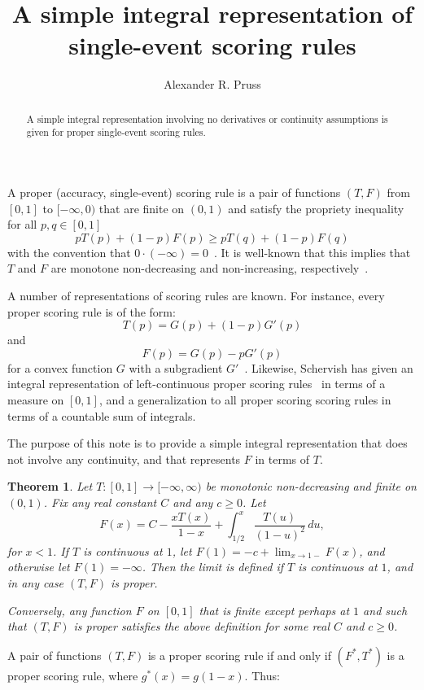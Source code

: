 \documentclass[11pt]{amsart} %
\title{A simple integral representation of single-event scoring rules}
\author{Alexander R. Pruss}
\newtheorem{thm}{Theorem}
\begin{document}
\begin{abstract}
A simple integral representation involving no derivatives or continuity assumptions is given for
proper single-event scoring rules.
\end{abstract}
\sloppy

\maketitle
A proper (accuracy, single-event) scoring rule is a pair of functions $(T,F)$ from $[0,1]$ to $[-\infty,0)$
that are finite on $(0,1)$ and satisfy the propriety inequality for all $p,q\in [0,1]$
$$
	p T(p) + (1-p) F(p) \ge p T(q) + (1-p) F(q)
$$
with the convention that $0 \cdot (-\infty)=0$~\cite{GR}. It is well-known that this
implies that $T$ and $F$ are monotone non-decreasing and non-increasing, respectively~\cite{Schervish}.

A number of representations of scoring rules are known.
For instance, every proper scoring rule is of the form:
$$
	T(p) = G(p)+(1-p)G'(p)
$$
and
$$
	F(p) = G(p)-pG'(p)
$$
for a convex function $G$ with a subgradient $G'$~\cite[p.~343]{GR}. Likewise, Schervish has given an integral representation of
left-continuous proper scoring rules~\cite{Schervish} in terms of a measure on $[0,1]$, and a generalization to all
proper scoring scoring rules in terms of a countable sum of integrals. 

The purpose of this note is to provide a simple integral representation that does not involve any continuity, and that represents $F$ in terms of $T$.

\begin{thm}\label{thm:repr}
Let $T:[0,1]\to[-\infty,\infty)$ be monotonic non-decreasing and finite on $(0,1)$.
Fix any real constant $C$ and any $c\ge 0$. Let
$$
	F(x) = C-\frac{xT(x)}{1-x}+\int_{1/2}^x \frac{T(u)}{(1-u)^2} \, du,
$$
for $x<1$. If $T$ is continuous at $1$, let $F(1)=-c+\lim_{x\to 1-} F(x)$, and otherwise
let $F(1)=-\infty$. Then the limit is defined if $T$ is continuous at $1$, and in any case $(T,F)$ is proper.

Conversely, any function $F$ on $[0,1]$ that is finite except perhaps at $1$ and such that
$(T,F)$ is proper satisfies the above definition for some real $C$ and $c\ge 0$. 
\end{thm}

A pair of functions $(T,F)$ is a proper scoring rule if and only if $(F^*,T^*)$ is a proper scoring rule,
where $g^*(x)=g(1-x)$. Thus:
\end{document}
